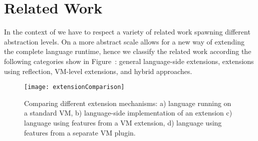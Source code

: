 \section{Related Work}

In the context of \B we have to respect a variety of related work spawning different abstraction levels.
On a more abstract scale \B allows for a new way of extending the complete language runtime, hence we classify the related work according the following categories show in Figure~: general language-side extensions, extensions using reflection, VM-level extensions, and hybrid approaches.
%
%
%


\begin{figure}
	\texttt{[image: extensionComparison]}
	\caption{Comparing different extension mechanisms: 
		a) language running on a standard VM, 
		b) language-side implementation of an extension
		c) language using features from a VM extension, 
		d) language using features from a separate VM plugin.}
\end{figure}
\vspace{-5mm}

